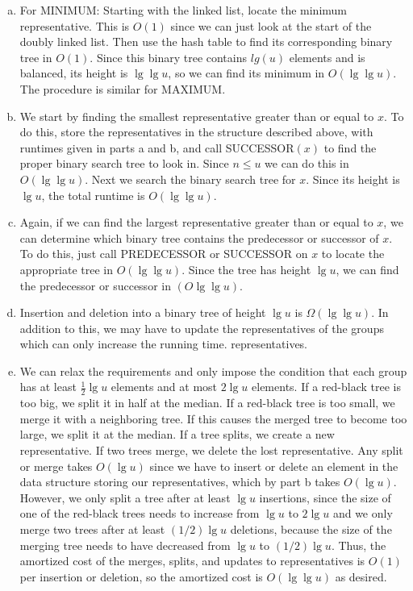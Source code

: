 \documentclass{article}
\begin{document}
\begin{enumerate}[a)]
\item  For MINIMUM:  Starting with the linked list, locate the minimum representative.  This is $O(1)$ since we can just look at the start of the doubly linked list.  Then use the hash table to find its corresponding binary tree in $O(1)$.  Since this binary tree contains $lg(u)$ elements and is balanced, its height is $\lg \lg u$, so we can find its minimum in $O(\lg \lg u)$.  The procedure is similar for MAXIMUM.

\item  We start by finding the smallest representative greater than or equal to $x$. To do this, store the representatives in the structure described above, with runtimes given in parts a and b, and call SUCCESSOR$(x)$ to find the proper binary search tree to look in.  Since $n \leq u$ we can do this in $O(\lg \lg u)$.  Next we search the binary search tree for $x$. Since its height is $\lg u$, the total runtime is $O(\lg \lg u)$. 

\item Again, if we can find the largest representative greater than or equal to $x$, we can determine which binary tree contains the predecessor or successor of $x$.  To do this, just call PREDECESSOR or SUCCESSOR on $x$ to locate the appropriate tree in $O(\lg \lg u)$.  Since the tree has height $\lg u$, we can find the predecessor or successor in $(O\lg \lg u)$.

\item Insertion and deletion into a binary tree of height $\lg u$ is $\Omega(\lg \lg u)$.  In addition to this, we may have to update the representatives of the groups which can only increase the running time. representatives. 

\item  We can relax the requirements and only impose the condition that each group has at least $\frac{1}{2}\lg u$ elements and at most $2 \lg u$ elements.  If a red-black tree is too big, we split it in half at the median.  If a red-black tree is too small, we merge it with a neighboring tree.  If this causes the merged tree to become too large, we split it at the median. If a tree splits, we create a new representative.  If two trees merge, we delete the lost representative.  Any split or merge takes $O(\lg u)$ since we have to insert or delete an element in the data structure storing our representatives, which by part b takes $O(\lg u)$.  However, we only split a tree after at least $\lg u$ insertions, since the size of one of the red-black trees needs to increase from $\lg u$ to $2 \lg u$ and we only merge two trees after at least $(1/2)\lg u$ deletions, because the size of the merging tree needs to have decreased from $\lg u$ to $(1/2)\lg u$.  Thus, the amortized cost of the merges, splits, and updates to representatives is $O(1)$ per insertion or deletion, so the amortized cost is $O(\lg \lg u)$ as desired. 
\end{enumerate}
\end{document}
